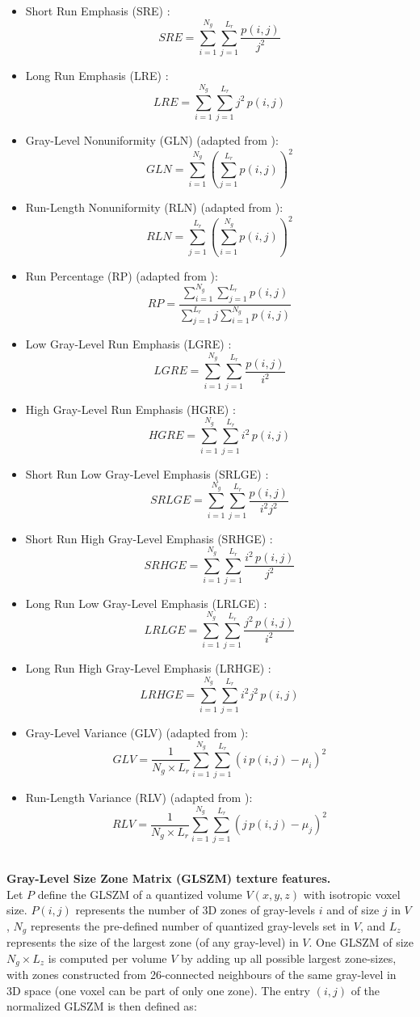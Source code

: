 \documentclass{article}
\begin{document}
\begin{itemize}
	\item Short Run Emphasis (SRE) \cite{GallowayMM1975}:
		  \[SRE = \sum_{i=1}^{N_g}\sum_{j=1}^{L_r} \frac{p(i,j)}{j^2}\]
	\item Long Run Emphasis (LRE) \cite{GallowayMM1975}:
		  \[LRE = \sum_{i=1}^{N_g}\sum_{j=1}^{L_r} j^2\,p(i,j)\]
	\item Gray-Level Nonuniformity (GLN) (adapted from \cite{GallowayMM1975}):
		  \[GLN = \sum_{i=1}^{N_g}\left(\sum_{j=1}^{L_r} p(i,j)\right)^2\]
	\item Run-Length Nonuniformity (RLN) (adapted from \cite{GallowayMM1975}):
		  \[RLN = \sum_{j=1}^{L_r}\left(\sum_{i=1}^{N_g} p(i,j)\right)^2\]
	\item Run Percentage (RP) (adapted from \cite{GallowayMM1975}):
		  \[RP = \frac{\sum_{i=1}^{N_g}\sum_{j=1}^{L_r} p(i,j)}{\sum_{j=1}^{L_r} j 
		  \sum_{i=1}^{N_g} p(i,j)}\]
	\item Low Gray-Level Run Emphasis (LGRE) \cite{ChuA1990}:
		  \[LGRE = \sum_{i=1}^{N_g}\sum_{j=1}^{L_r} \frac{p(i,j)}{i^2}\]
	\item High Gray-Level Run Emphasis (HGRE) \cite{ChuA1990}:
		  \[HGRE = \sum_{i=1}^{N_g}\sum_{j=1}^{L_r} i^2\,p(i,j)\]
	\item Short Run Low Gray-Level Emphasis (SRLGE) \cite{DasarathyBV1991}:
		  \[SRLGE = \sum_{i=1}^{N_g}\sum_{j=1}^{L_r} \frac{p(i,j)}{i^2j^2}\]
	\item Short Run High Gray-Level Emphasis (SRHGE) \cite{DasarathyBV1991}:
		  \[SRHGE = \sum_{i=1}^{N_g}\sum_{j=1}^{L_r} \frac{i^2\,p(i,j)}{j^2}\]
	\item Long Run Low Gray-Level Emphasis (LRLGE) \cite{DasarathyBV1991}:
		  \[LRLGE = \sum_{i=1}^{N_g}\sum_{j=1}^{L_r} \frac{j^2\,p(i,j)}{i^2}\]
	\item Long Run High Gray-Level Emphasis (LRHGE) \cite{DasarathyBV1991}:
		  \[LRHGE = \sum_{i=1}^{N_g}\sum_{j=1}^{L_r} i^2j^2\,p(i,j)\]
	\item Gray-Level Variance (GLV) (adapted from \cite{ThibaultG2009}):
		  \[GLV = \frac{1}{N_g \times L_r} \sum_{i=1}^{N_g}\sum_{j=1}^{L_r} 
		  \left(i\,p(i,j)-\mu_i\right)^2\]
	\item Run-Length Variance (RLV) (adapted from \cite{ThibaultG2009}):
		  \[RLV = \frac{1}{N_g \times L_r} \sum_{i=1}^{N_g}\sum_{j=1}^{L_r} 
		  \left(j\,p(i,j)-\mu_j\right)^2\]
	\\
\end{itemize}


\noindent \textbf{Gray-Level Size Zone Matrix (GLSZM) texture features.} \\
Let $P$ define the GLSZM of a quantized volume $V(x,y,z)$ with isotropic voxel size. $P(i,j)$ represents the number of 3D zones of gray-levels $i$ and of size $j$ in $V$, $N_g$ represents the pre-defined number of quantized gray-levels set in $V$, and $L_z$ represents the size of the largest zone (of any gray-level) in $V$.  One GLSZM of size $N_g \times L_z$ is computed per volume $V$ by adding up all possible largest zone-sizes, with zones constructed from 26-connected neighbours  of the same gray-level in 3D space (one voxel can be part of only one zone). The entry $(i,j)$ of the normalized GLSZM is then defined as:
\end{document}
